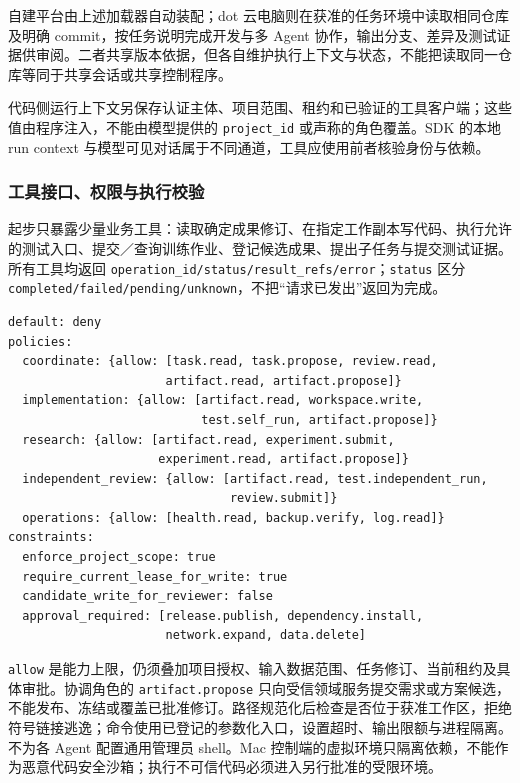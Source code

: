\documentclass[11pt,a4paper]{article}
\begin{document}
自建平台由上述加载器自动装配；dot 云电脑则在获准的任务环境中读取相同仓库及明确 commit，按任务说明完成开发与多 Agent 协作，输出分支、差异及测试证据供审阅。二者共享版本依据，但各自维护执行上下文与状态，不能把读取同一仓库等同于共享会话或共享控制程序。

代码侧运行上下文另保存认证主体、项目范围、租约和已验证的工具客户端；这些值由程序注入，不能由模型提供的 \texttt{project\_id} 或声称的角色覆盖。SDK 的本地 run context 与模型可见对话属于不同通道，工具应使用前者核验身份与依赖。\cite{rdRuntimeAgent}

\subsubsection{工具接口、权限与执行校验}

起步只暴露少量业务工具：读取确定成果修订、在指定工作副本写代码、执行允许的测试入口、提交／查询训练作业、登记候选成果、提出子任务与提交测试证据。所有工具均返回 \texttt{operation\_id/status/result\_refs/error}；\texttt{status} 区分 \texttt{completed/failed/pending/unknown}，不把“请求已发出”返回为完成。

\par\noindent\begin{minipage}{\linewidth}
\begin{lstlisting}[caption={policies.yaml 核心片段；由工具网关强制执行}]
default: deny
policies:
  coordinate: {allow: [task.read, task.propose, review.read,
                      artifact.read, artifact.propose]}
  implementation: {allow: [artifact.read, workspace.write,
                           test.self_run, artifact.propose]}
  research: {allow: [artifact.read, experiment.submit,
                     experiment.read, artifact.propose]}
  independent_review: {allow: [artifact.read, test.independent_run,
                               review.submit]}
  operations: {allow: [health.read, backup.verify, log.read]}
constraints:
  enforce_project_scope: true
  require_current_lease_for_write: true
  candidate_write_for_reviewer: false
  approval_required: [release.publish, dependency.install,
                      network.expand, data.delete]
\end{lstlisting}
\end{minipage}\par


\texttt{allow} 是能力上限，仍须叠加项目授权、输入数据范围、任务修订、当前租约及具体审批。协调角色的 \texttt{artifact.propose} 只向受信领域服务提交需求或方案候选，不能发布、冻结或覆盖已批准修订。路径规范化后检查是否位于获准工作区，拒绝符号链接逃逸；命令使用已登记的参数化入口，设置超时、输出限额与进程隔离。不为各 Agent 配置通用管理员 shell。Mac 控制端的虚拟环境只隔离依赖，不能作为恶意代码安全沙箱；执行不可信代码必须进入另行批准的受限环境。
\end{document}

